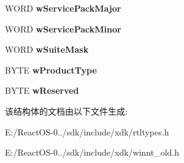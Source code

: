 \begin{DoxyCompactItemize}
W\+O\+RD {\bfseries w\+Service\+Pack\+Major}
\item 
\mbox{\label{struct___o_s_v_e_r_s_i_o_n_i_n_f_o_e_x_w_adff98bc7bffe8ca07fbd4da2d12d86de}} 
W\+O\+RD {\bfseries w\+Service\+Pack\+Minor}
\item 
\mbox{\label{struct___o_s_v_e_r_s_i_o_n_i_n_f_o_e_x_w_acb6490bb29ae5c65c8ce4e8962269db6}} 
W\+O\+RD {\bfseries w\+Suite\+Mask}
\item 
\mbox{\label{struct___o_s_v_e_r_s_i_o_n_i_n_f_o_e_x_w_ae0316c7202b794d51cc44a50cb9087d9}} 
B\+Y\+TE {\bfseries w\+Product\+Type}
\item 
\mbox{\label{struct___o_s_v_e_r_s_i_o_n_i_n_f_o_e_x_w_a4651fda3b80713182840001575e730af}} 
B\+Y\+TE {\bfseries w\+Reserved}
\end{DoxyCompactItemize}


该结构体的文档由以下文件生成\+:\begin{DoxyCompactItemize}
\item 
E\+:/\+React\+O\+S-\/0../sdk/include/xdk/rtltypes.\+h\item 
E\+:/\+React\+O\+S-\/0../sdk/include/xdk/winnt\+\_\+old.\+h\end{DoxyCompactItemize}
